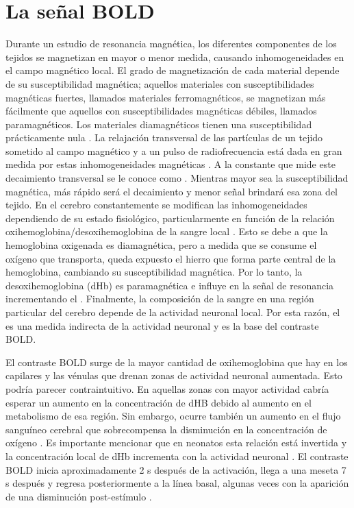 \section{La señal BOLD}
Durante un estudio de resonancia magnética, los diferentes componentes de los tejidos se magnetizan en mayor o menor medida, causando inhomogeneidades en el campo magnético local. El grado de magnetización de cada material depende de su susceptibilidad magnética; aquellos materiales con susceptibilidades magnéticas fuertes, llamados materiales ferromagnéticos, se magnetizan más fácilmente que aquellos con susceptibilidades magnéticas débiles, llamados paramagnéticos. Los materiales diamagnéticos tienen una susceptibilidad prácticamente nula \cite{Runge2009}. La relajación transversal de las partículas de un tejido sometido al campo magnético \Bzero y a un pulso de radiofrecuencia está dada en gran medida por estas inhomogeneidades magnéticas . A la constante que mide este decaimiento transversal se le conoce como \Ttwostar. Mientras mayor sea la susceptibilidad magnética, más rápido será el decaimiento y menor señal brindará esa zona del tejido. En el cerebro constantemente se modifican las inhomogeneidades dependiendo de su estado fisiológico, particularmente en función de la relación oxihemoglobina/desoxihemoglobina de la sangre local \cite{LogothetisNK2004}. Esto se debe a que la hemoglobina oxigenada es diamagnética, pero a medida que se consume el oxígeno que transporta, queda expuesto el hierro que forma parte central de la hemoglobina, cambiando su susceptibilidad magnética. Por lo tanto, la desoxihemoglobina (dHb) es paramagnética e influye en la señal de resonancia incrementando el \Ttwostar. Finalmente, la composición de la sangre en una región particular del cerebro depende de la actividad neuronal local. Por esta razón, el \Ttwostar es una medida indirecta de la actividad neuronal y es la base del contraste BOLD. 

El contraste BOLD surge de la mayor cantidad de oxihemoglobina que hay en los capilares y las vénulas que drenan zonas de actividad neuronal aumentada. Esto podría parecer contraintuitivo. En aquellas zonas con mayor actividad cabría esperar un aumento en la concentración de dHB debido al aumento en el metabolismo de esa región. Sin embargo, ocurre también un aumento en el flujo sanguíneo cerebral que sobrecompensa la disminución en la concentración de oxígeno \cite{LogothetisNK2004}. Es importante mencionar que en neonatos esta relación está invertida y la concentración local de dHb incrementa con la actividad neuronal \cite{PM2001}. El contraste BOLD inicia aproximadamente 2 s después de la activación, llega a una meseta 7 s después y regresa posteriormente a la línea basal, algunas veces con la aparición de una disminución post-estímulo \cite{LogothetisNK2004}.


